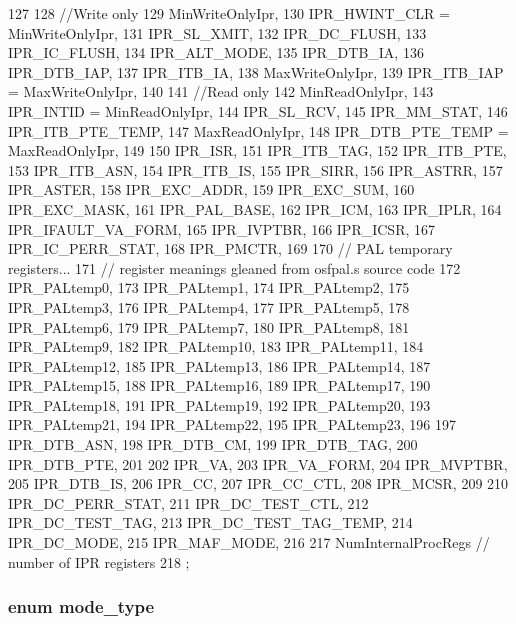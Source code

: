 \begin{DoxyCode}
127 {
128     //Write only
129     MinWriteOnlyIpr,
130     IPR_HWINT_CLR = MinWriteOnlyIpr,
131     IPR_SL_XMIT,
132     IPR_DC_FLUSH,
133     IPR_IC_FLUSH,
134     IPR_ALT_MODE,
135     IPR_DTB_IA,
136     IPR_DTB_IAP,
137     IPR_ITB_IA,
138     MaxWriteOnlyIpr,
139     IPR_ITB_IAP = MaxWriteOnlyIpr,
140 
141     //Read only
142     MinReadOnlyIpr,
143     IPR_INTID = MinReadOnlyIpr,
144     IPR_SL_RCV,
145     IPR_MM_STAT,
146     IPR_ITB_PTE_TEMP,
147     MaxReadOnlyIpr,
148     IPR_DTB_PTE_TEMP = MaxReadOnlyIpr,
149 
150     IPR_ISR,
151     IPR_ITB_TAG,
152     IPR_ITB_PTE,
153     IPR_ITB_ASN,
154     IPR_ITB_IS,
155     IPR_SIRR,
156     IPR_ASTRR,
157     IPR_ASTER,
158     IPR_EXC_ADDR,
159     IPR_EXC_SUM,
160     IPR_EXC_MASK,
161     IPR_PAL_BASE,
162     IPR_ICM,
163     IPR_IPLR,
164     IPR_IFAULT_VA_FORM,
165     IPR_IVPTBR,
166     IPR_ICSR,
167     IPR_IC_PERR_STAT,
168     IPR_PMCTR,
169 
170     // PAL temporary registers...
171     // register meanings gleaned from osfpal.s source code
172     IPR_PALtemp0,
173     IPR_PALtemp1,
174     IPR_PALtemp2,
175     IPR_PALtemp3,
176     IPR_PALtemp4,
177     IPR_PALtemp5,
178     IPR_PALtemp6,
179     IPR_PALtemp7,
180     IPR_PALtemp8,
181     IPR_PALtemp9,
182     IPR_PALtemp10,
183     IPR_PALtemp11,
184     IPR_PALtemp12,
185     IPR_PALtemp13,
186     IPR_PALtemp14,
187     IPR_PALtemp15,
188     IPR_PALtemp16,
189     IPR_PALtemp17,
190     IPR_PALtemp18,
191     IPR_PALtemp19,
192     IPR_PALtemp20,
193     IPR_PALtemp21,
194     IPR_PALtemp22,
195     IPR_PALtemp23,
196 
197     IPR_DTB_ASN,
198     IPR_DTB_CM,
199     IPR_DTB_TAG,
200     IPR_DTB_PTE,
201 
202     IPR_VA,
203     IPR_VA_FORM,
204     IPR_MVPTBR,
205     IPR_DTB_IS,
206     IPR_CC,
207     IPR_CC_CTL,
208     IPR_MCSR,
209 
210     IPR_DC_PERR_STAT,
211     IPR_DC_TEST_CTL,
212     IPR_DC_TEST_TAG,
213     IPR_DC_TEST_TAG_TEMP,
214     IPR_DC_MODE,
215     IPR_MAF_MODE,
216 
217     NumInternalProcRegs             // number of IPR registers
218 };
\end{DoxyCode}
\hypertarget{namespaceAlphaISA_a19269c193c0c4866cdc4e5abd433f9fc}{
\subsubsection[{mode\_\-type}]{\setlength{\rightskip}{0pt plus 5cm}enum {\bf mode\_\-type}}}
\label{namespaceAlphaISA_a19269c193c0c4866cdc4e5abd433f9fc}
